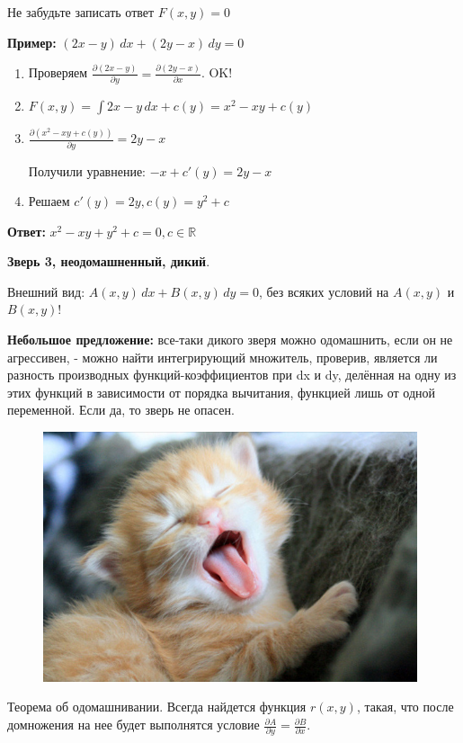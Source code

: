 \documentclass[10pt, a4paper]{article}
\begin{document}
\par Не забудьте записать ответ $F(x,y) = 0$
\par \textbf{Пример:} $(2x - y) \, dx + (2y - x) \, dy = 0$
\begin{enumerate}
\item Проверяем $\frac{\partial{(2x-y)}}{\partial{y}} = \frac{\partial{(2y-x)}}{\partial{x}}$. OK!
\item $F(x,y) = \int 2x - y \, dx + c(y) = x^2 - xy + c(y)$
\item $\frac{\partial{(x^2 - xy + c(y))}}{\partial{y}} = 2y - x$
\par Получили уравнение: $ -x + c'(y) = 2y - x$
\item Решаем $c'(y) = 2y, c(y) = y^2 + c$
\end{enumerate}
\par \textbf{Ответ:} $x^2 - xy + y^2 + c = 0, c \in \mathbb{R}$ \\
\par \textbf{Зверь 3, неодомашненный, дикий}.
\par Внешний вид: $A(x, y) \, dx + B(x,y) \, dy = 0$, без всяких условий на $A(x,y)$ и $B(x,y)$!
\par \textbf{Небольшое предложение:} все-таки дикого зверя можно одомашнить, если
он не агрессивен, - можно найти интегрирующий множитель, проверив,
является ли разность производных функций-коэффициентов при dx и dy,
делённая на одну из этих функций в зависимости от порядка вычитания,
функцией лишь от одной переменной. Если да, то зверь не опасен.
\newpage
\pagecolor{magenta}
\begin{figure}[h]
\centering
\includegraphics[width=11cm]{pussy.jpg}
\end{figure}
\par Теорема об одомашнивании. Всегда найдется функция $r(x,y)$, такая, что после домножения на нее будет выполнятся условие $\frac{\partial{A}}{\partial{y}} = \frac{\partial{B}}{\partial{x}}$.
\end{document}
